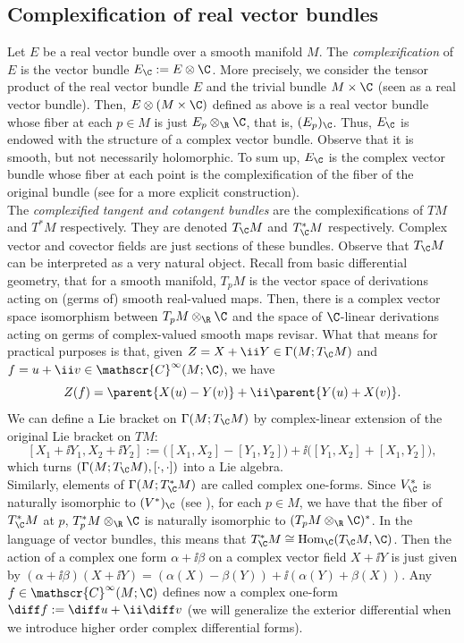 \subsection{Complexification of real vector bundles}
Let \(E\) be a real vector bundle over a smooth manifold \(M\). The \textit{complexification} of \(E\) is the vector bundle \(E_\C:=E \otimes  \C\). More precisely, we consider the tensor product of the real vector bundle \(E\) and the trivial bundle \(M \times \C\) (seen as a real vector bundle). Then, \(E \otimes (M \times \C)\) defined as above is a real vector bundle whose fiber at each \(p \in M\) is just \(E_p \otimes_\R \C\), that is, \((E_p)_\C\). Thus, \(E_\C\) is endowed with the structure of a complex vector bundle. Observe that it is smooth, but not necessarily holomorphic. To sum up, \(E_\C\) is the complex vector bundle whose fiber at each point is the complexification of the fiber of the original bundle (see \parencite[Ch. 1]{lee_introCM} for a more explicit construction). \\

The \textit{complexified tangent and cotangent bundles} are the complexifications of \(TM\) and \(T^*M\) respectively. They are denoted \(T_\C M\) and \(T_\C^* M\) respectively. Complex vector and covector fields are just sections of these bundles. Observe that \(T_\C M\) can be interpreted as a very natural object. Recall from basic differential geometry, that for a smooth manifold, \(T_pM\) is the vector space of derivations acting on (germs of) smooth real-valued maps. Then, there is a complex vector space isomorphism between \(T_pM \otimes_\R \C\) and the space of \(\C\)-linear derivations acting on germs of complex-valued smooth maps {\color{red} revisar}. What that means for practical purposes is that, given \(Z=X+\ii Y \in \Gamma(M; T_\C M)\) and \(f=u+\ii v \in \mathscr{C}^\infty(M;\C)\), we have 
\[
Z(f)=\parent{X(u)-Y(v)} + \ii \parent{Y(u)+X(v)}.
\]
We can define a Lie bracket on \(\Gamma(M; T_\C M)\) by complex-linear extension of the original Lie bracket on \(TM\):
\[
[X_1+\ii Y_1, X_2+ \ii Y_2]:=\big([X_1, X_2]-[Y_1, Y_2] \big) + \ii \big([Y_1, X_2]+[X_1, Y_2]\big),
\]
which turns \((\Gamma(M; T_\C M), [\cdot, \cdot])\) into a Lie algebra. \\

Similarly, elements of \(\Gamma(M; T_\C^*M)\) are called complex one-forms. Since \(V_\C^*\) is naturally isomorphic to \((V^*)_\C\) (see \parencite[Lemma 1.2.6]{huybrechts2005complex}), for each \(p \in M\), we have that the fiber of \(T_\C^*M\) at \(p\), \(T_p^*M \otimes _\R \C\) is naturally isomorphic to \((T_pM \otimes_\R  \C)^*\). In the language of vector bundles, this means that \(T_\C^* M \cong \mathrm{Hom}_\C(T_\C M, \C)\). Then the action of a complex one form \(\alpha + \ii \beta\) on a complex vector field \(X + \ii Y\) is just given by \((\alpha + \ii \beta)(X+\ii Y)=(\alpha(X)-\beta(Y))+\ii (\alpha(Y)+\beta(X))\). Any \(f \in \mathscr{C}^\infty(M;\C)\) defines now a complex one-form \(\diff f:=\diff u + \ii \diff v\) (we will generalize the exterior differential when we introduce higher order complex differential forms). 

